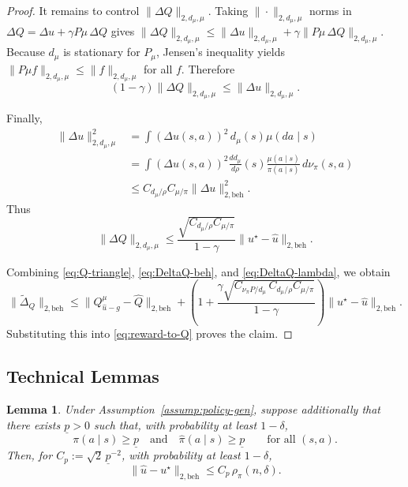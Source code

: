 \documentclass{article}
\newtheorem{lemma}{Lemma}
\newcommand{\1}{\mathbbm{1}}
\begin{document}
\begin{proof}
It remains to control \(\|\Delta Q\|_{2,d_\mu,\mu}\). Taking \(\|\cdot\|_{2,d_\mu,\mu}\) norms in
\(
\Delta Q=\Delta u+\gamma P\mu\,\Delta Q
\)
gives
\(
\|\Delta Q\|_{2,d_\mu,\mu}
\le
\|\Delta u\|_{2,d_\mu,\mu}
+
\gamma\|P\mu\,\Delta Q\|_{2,d_\mu,\mu}.
\)
Because \(d_\mu\) is stationary for \(P_\mu\), Jensen's inequality yields
\(
\|P\mu f\|_{2,d_\mu,\mu}\le \|f\|_{2,d_\mu,\mu}
\)
for all \(f\). Therefore
\[
(1-\gamma)\|\Delta Q\|_{2,d_\mu,\mu}
\le
\|\Delta u\|_{2,d_\mu,\mu}.
\]

Finally,
\begin{align*}
\|\Delta u\|_{2,d_\mu,\mu}^2
&=
\int (\Delta u(s,a))^2\,d_\mu(s)\mu(da\mid s) \\
&=
\int (\Delta u(s,a))^2
\frac{dd_\mu}{d\rho}(s)\frac{\mu(a\mid s)}{\pi(a\mid s)}
\,d\nu_\pi(s,a) \\
&\le
C_{d_\mu/\rho}C_{\mu/\pi}\|\Delta u\|_{2,\mathrm{beh}}^2.
\end{align*}
Thus
\begin{equation}
\label{eq:DeltaQ-lambda}
\|\Delta Q\|_{2,d_\mu,\mu}
\le
\frac{\sqrt{C_{d_\mu/\rho}C_{\mu/\pi}}}{1-\gamma}
\|u^\star-\hat u\|_{2,\mathrm{beh}}.
\end{equation}

Combining \eqref{eq:Q-triangle}, \eqref{eq:DeltaQ-beh}, and \eqref{eq:DeltaQ-lambda}, we obtain
\[
\|\widetilde\Delta_Q\|_{2,\mathrm{beh}}
\le
\|Q^\mu_{\hat u-g}-\hat Q\|_{2,\mathrm{beh}}
+
\left(
1+\frac{\gamma\sqrt{C_{\nu_\pi P/d_\mu}\,C_{d_\mu/\rho}C_{\mu/\pi}}}{1-\gamma}
\right)
\|u^\star-\hat u\|_{2,\mathrm{beh}}.
\]
Substituting this into \eqref{eq:reward-to-Q} proves the claim.
\end{proof}


\subsection{Technical Lemmas}
\label{appendix:lemmas}

\begin{lemma}
\label{lemma::KLell2}
Under Assumption~\ref{assump:policy-gen}, suppose additionally that there
exists \(\underline p>0\) such that, with probability at least \(1-\delta\),
\[
\pi(a\mid s)\ge \underline p
\quad\text{and}\quad
\hat\pi(a\mid s)\ge \underline p
\qquad\text{for all }(s,a).
\]
Then, for \(C_p:=\sqrt{2}\,\underline p^{-2}\), with probability at least
\(1-\delta\),
\[
\|\hat u-u^\star\|_{2, \mathrm{beh}}
\le
C_p\,\rho_{\pi}(n,\delta).
\]
\end{lemma}
\end{document}
